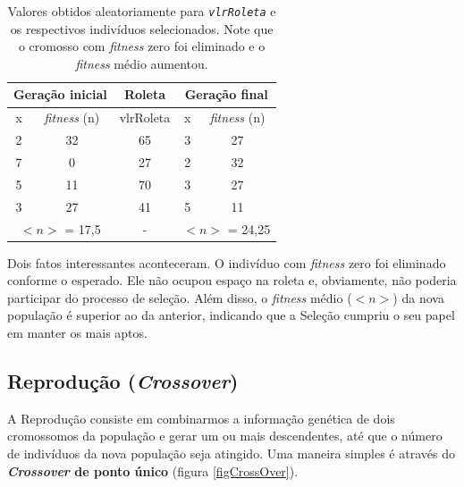 \begin{table}[htp]
	\caption{\label{tabRoletaManual}Valores obtidos aleatoriamente para \textit{\texttt{vlrRoleta}} e os respectivos indivíduos selecionados. Note que o cromosso com \textit{fitness} zero foi eliminado e o \textit{fitness} médio aumentou.}
	\begin{center}
		\begin{tabular}{c|c|c|c|c}
			\hline
			\multicolumn{2}{c|}{\textbf{Geração inicial}} & \textbf{Roleta}& \multicolumn{2}{c}{\textbf{Geração final}}  \\
			\hline
			x 					& \textit{fitness} (n)	& vlrRoleta						& x						& \textit{fitness} (n)	\\
			\hline
			2 					& 32										& 65 									& 3						&	27   \\
			7 					& 0 										& 27 									& 2						&	32\\
			5 					& 11										& 70 									& 3						&	27\\	
			3 					& 27										& 41 									& 5						&	11\\
			\hline
			\multicolumn{2}{c|}{$<n>$ = 17,5} & - & \multicolumn{2}{c}{$<n>$ = 24,25}  \\
			\hline
		\end{tabular}
	\end{center}
\end{table}
	
	Dois fatos interessantes aconteceram. O indivíduo com \textit{fitness} zero foi eliminado conforme o esperado. Ele não ocupou espaço na roleta e, obviamente, não poderia participar do processo de seleção. Além disso, o \textit{fitness} médio ($<n>$) da nova população é superior ao da anterior, indicando que a Seleção cumpriu o seu papel em manter os mais aptos.
	
	
	\subsection{\label{crossover}Reprodução (\textit{Crossover})}

	A Reprodução consiste em combinarmos a informação genética de dois cromossomos da população e gerar um ou mais descendentes, até que o número de indivíduos da nova população seja atingido. Uma maneira simples é através do \textbf{\textit{Crossover} de ponto único} (figura \ref{figCrossOver}).
	
